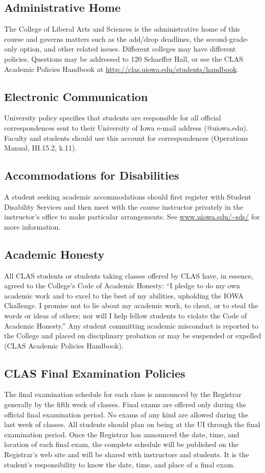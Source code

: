 \documentclass[10pt]{article}
\begin{document}
\subsection*{Administrative Home}
The College of Liberal Arts and Sciences is the administrative home of this
course and governs matters such as the add/drop deadlines, the
second-grade-only option, and other related issues. Different colleges may
have different policies. Questions may be addressed to 120 Schaeffer Hall, or
see the CLAS Academic Policies Handbook at
\url{http://clas.uiowa.edu/students/handbook}.

\subsection*{Electronic Communication}
University policy specifies that students are responsible for all official
correspondences sent to their University of Iowa e-mail address (@uiowa.edu).
Faculty and students should use this account for correspondences (Operations
Manual, III.15.2, k.11).

\subsection*{Accommodations for Disabilities}
A student seeking academic accommodations should first register with Student
Disability Services and then meet with the course instructor privately in the
instructor's office to make particular arrangements. See
\url{www.uiowa.edu/~sds/} for more information.

\subsection*{Academic Honesty}
All CLAS students or students taking classes offered by CLAS have, in essence,
agreed to the College's Code of Academic Honesty: ``I pledge to do my own
academic work and to excel to the best of my abilities, upholding the IOWA
Challenge. I promise not to lie about my academic work, to cheat, or to steal
the words or ideas of others; nor will I help fellow students to violate the
Code of Academic Honesty.'' Any student committing academic misconduct is
reported to the College and placed on disciplinary probation or may be
suspended or expelled (CLAS Academic Policies Handbook).

\subsection*{CLAS Final Examination Policies}
The final examination schedule for each class is announced by the Registrar
generally by the fifth week of classes. Final exams are offered only during the
official final examination period. No exams of any kind are allowed during the
last week of classes. All students should plan on being at the UI through the
final examination period. Once the Registrar has announced the date, time, and
location of each final exam, the complete schedule will be published on the
Registrar's web site and will be shared with instructors and students. It is
the student's responsibility to know the date, time, and place of a final exam.
\end{document}
